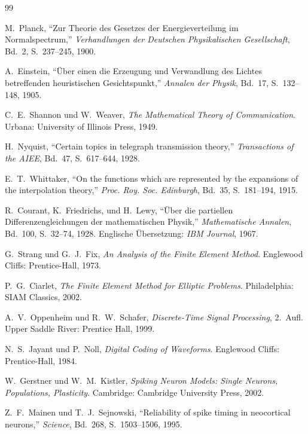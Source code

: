 ﻿\documentclass[a4paper,12pt]{article}
\theoremstyle{definition}
\begin{document}
\clearpage
{}
{}
\begin{thebibliography}{99}

M.~Planck, ``Zur Theorie des Gesetzes der Energieverteilung im Normalspectrum,'' \textit{Verhandlungen der Deutschen Physikalischen Gesellschaft}, Bd.~2, S.~237--245, 1900.

A.~Einstein, ``Über einen die Erzeugung und Verwandlung des Lichtes betreffenden heuristischen Gesichtspunkt,'' \textit{Annalen der Physik}, Bd.~17, S.~132--148, 1905.

C.~E.~Shannon und W.~Weaver, \textit{The Mathematical Theory of Communication}. Urbana: University of Illinois Press, 1949.

H.~Nyquist, ``Certain topics in telegraph transmission theory,'' \textit{Transactions of the AIEE}, Bd.~47, S.~617--644, 1928.

E.~T.~Whittaker, ``On the functions which are represented by the expansions of the interpolation theory,'' \textit{Proc. Roy. Soc. Edinburgh}, Bd.~35, S.~181--194, 1915.

R.~Courant, K.~Friedrichs, und H.~Lewy, ``Über die partiellen Differenzengleichungen der mathematischen Physik,'' \textit{Mathematische Annalen}, Bd.~100, S.~32--74, 1928. Englische Übersetzung: \textit{IBM Journal}, 1967.

G.~Strang und G.~J.~Fix, \textit{An Analysis of the Finite Element Method}. Englewood Cliffs: Prentice-Hall, 1973.

P.~G.~Ciarlet, \textit{The Finite Element Method for Elliptic Problems}. Philadelphia: SIAM Classics, 2002.

A.~V.~Oppenheim und R.~W.~Schafer, \textit{Discrete-Time Signal Processing}, 2.~Aufl. Upper Saddle River: Prentice Hall, 1999.

N.~S.~Jayant und P.~Noll, \textit{Digital Coding of Waveforms}. Englewood Cliffs: Prentice-Hall, 1984.

W.~Gerstner und W.~M.~Kistler, \textit{Spiking Neuron Models: Single Neurons, Populations, Plasticity}. Cambridge: Cambridge University Press, 2002.

Z.~F.~Mainen und T.~J.~Sejnowski, ``Reliability of spike timing in neocortical neurons,'' \textit{Science}, Bd.~268, S.~1503--1506, 1995.


\end{thebibliography}
\end{document}
